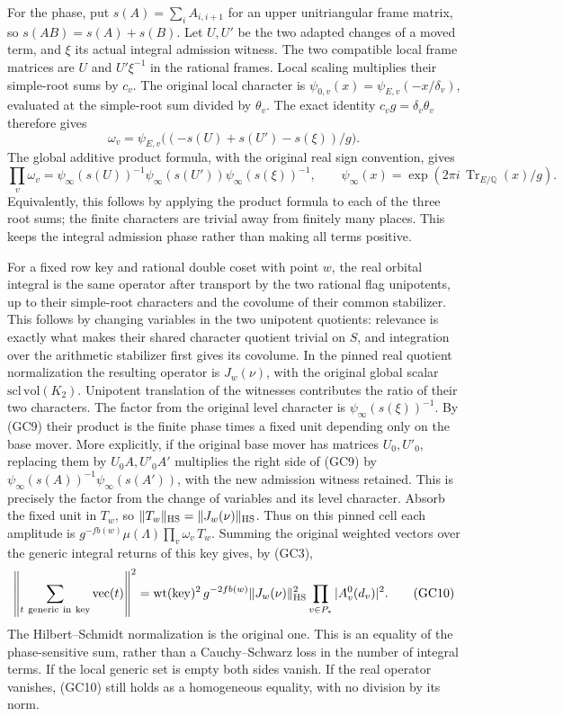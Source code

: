 For the phase, put
\(s(A)=\sum_i A_{i,i+1}\) for an upper unitriangular
frame matrix, so \(s(AB)=s(A)+s(B)\).
Let \(U,U'\) be the two adapted changes of a moved term,
and \(\xi\) its actual integral admission witness. The
two compatible local frame matrices are \(U\) and
\(U'\xi^{-1}\) in the rational frames.
Local scaling multiplies their simple-root sums by
\(c_v\). The original local character is
\(\psi_{0,v}(x)=\psi_{E,v}(-x/\delta_v)\), evaluated
at the simple-root sum divided by \(\theta_v\).
The exact identity \(c_vg=\delta_v\theta_v\) therefore
gives
\[
 \omega_v=
 \psi_{E,v}\bigl((-s(U)+s(U')-s(\xi))/g\bigr).
\]
The global additive product formula, with the original
real sign convention, gives
\[
 \prod_v\omega_v
   =\psi_\infty(s(U))^{-1}\psi_\infty(s(U'))
                          \psi_\infty(s(\xi))^{-1},
 \qquad
 \psi_\infty(x)=\exp(2\pi i\,\operatorname{Tr}_{E/\mathbb Q}(x)/g).
 \tag{GC9}
\]
Equivalently, this follows by applying the product formula
to each of the three root sums; the finite characters
are trivial away from finitely many places. This keeps the
integral admission phase rather than making all terms
positive.

For a fixed row key and rational double coset with point
\(w\), the real orbital integral is the same operator
after transport by the two rational flag unipotents,
up to their simple-root characters and the covolume
of their common stabilizer. This follows by changing
variables in the two unipotent quotients: relevance is
exactly what makes their shared character quotient
trivial on \(S\), and integration over the arithmetic
stabilizer first gives its covolume. In the pinned
real quotient normalization the resulting operator is
\(J_w(\nu)\), with the original global scalar
\(\mathrm{scl}\,\mathrm{vol}(K_2)\). Unipotent translation
of the witnesses contributes the ratio of their two
characters. The factor from the original level character
is \(\psi_\infty(s(\xi))^{-1}\). By (GC9) their product
is the finite phase times a fixed unit depending only on
the base mover. More explicitly, if the original
base mover has matrices \(U_0,U'_0\), replacing them
by \(U_0 A,U'_0 A'\) multiplies the right side of (GC9)
by \(\psi_\infty(s(A))^{-1}\psi_\infty(s(A'))\), with
the new admission witness retained. This is precisely
the factor from the change of variables and its level
character. Absorb the fixed unit in \(T_w\), so
\(\|T_w\|_{\rm HS}=\|J_w(\nu)\|_{\rm HS}\).
Thus on this pinned cell each amplitude is
\(g^{-fb(w)}\mu(\Lambda)\prod_v\omega_v\,T_w\).
Summing the original weighted vectors over the generic
integral returns of this key gives, by (GC3),
\[
 \left\|\sum_{t\ {\rm generic\ in\ key}}\operatorname{vec}(t)
            \right\|^2
 =\mathrm{wt}(\mathrm{key})^2\,g^{-2fb(w)}
                  \|J_w(\nu)\|_{\rm HS}^2
                   \prod_{v\in P_*}|A_v^0(d_v)|^2.
 \tag{GC10}
\]
The Hilbert--Schmidt normalization is the original one.
This is an equality of the phase-sensitive sum, rather
than a Cauchy--Schwarz loss in the number of integral terms.
If the local generic set is empty both sides vanish.
If the real operator vanishes, (GC10) still holds as a
homogeneous equality, with no division by its norm.

